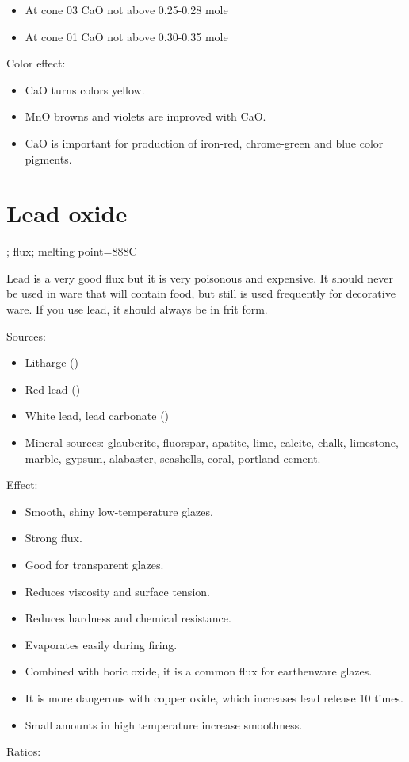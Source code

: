 \begin{itemize}
  \item At cone 03 CaO not above 0.25-0.28 mole
  \item At cone 01 CaO not above 0.30-0.35 mole
\end{itemize}
Color effect:
\begin{itemize}
  \item CaO turns  colors yellow.
  \item MnO browns and violets are improved with CaO.
  \item CaO is important for production of iron-red, chrome-green and blue 
  color pigments.
\end{itemize}
\section{Lead oxide}
; flux; melting point=888\degree C

Lead is a very good flux but it is very poisonous and expensive. It should 
never be used in ware that will contain food, but still is used frequently for 
decorative ware. If you use lead, it should always be in frit form.

Sources:
\begin{itemize}
\item Litharge ()
\item Red lead ()
  \item White lead, lead carbonate ()
  \item Mineral sources: glauberite, fluorspar, apatite, lime, calcite, chalk, 
  limestone, marble, gypsum, alabaster, seashells, coral, portland cement.
\end{itemize}
Effect:
\begin{itemize}
  \item Smooth, shiny low-temperature glazes.
  \item Strong flux.
  \item Good for transparent glazes.
  \item Reduces viscosity and surface tension.
  \item Reduces hardness and chemical resistance.
  \item Evaporates easily during firing.
  \item Combined with boric oxide, it is a common flux for earthenware glazes.
  \item It is more dangerous with copper oxide, which increases lead release 10 
  times.
  \item Small amounts in high temperature increase smoothness.
\end{itemize}
Ratios:

